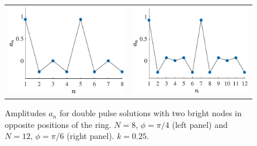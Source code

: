 \documentclass[12pt,reqno]{amsart}
\begin{document}
\begin{figure}[H]
\begin{center}
\begin{tabular}{cc}
\includegraphics[width=7.5cm]{images/dp8pi4} &
\includegraphics[width=7.5cm]{images/dp12pi6}
\end{tabular}
\end{center}
\caption{Amplitudes $a_n$ for double pulse solutions with two bright nodes in opposite positions of the ring. $N=8$, $\phi=\pi/4$ (left panel) and $N=12$, $\phi=\pi/6$ (right panel). $k=0.25$.}
\label{fig:dp}
\end{figure}
\end{document}
